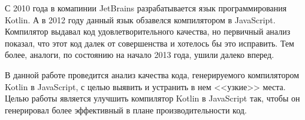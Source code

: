 С 2010 года в комапинии JetBrains разрабатывается язык программирования Kotlin. А в 2012 году данный язык обзавелся компилятором в JavaScript. Компилятор выдавал код удовлетворительного качества, но первичный анализ показал, что этот код далек от совершенства и хотелось бы это исправить. Тем более, аналоги, по состоянию на начало 2013 года, ушили далеко вперед.

В данной работе проведится анализ качества кода, генерируемого компилятором Kotlin в JavaScript, с целью выявить и устранить в нем <<узкие>> места. Целью работы является улучшить компилятор Kotlin в JavaScript так, чтобы он генерировал более эффективный в плане производительности код.





